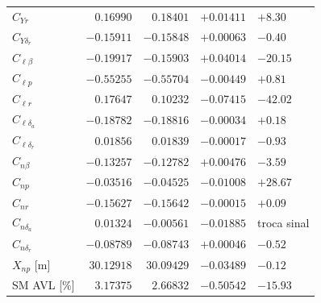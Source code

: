 \begin{tabular}{lrrrl}
$C_{Yr}$ & $0.16990$ & $0.18401$ & $+0.01411$ & $+8.30$ \\
$C_{Y\delta_r}$ & $-0.15911$ & $-0.15848$ & $+0.00063$ & $-0.40$ \\
$C_{\ell\beta}$ & $-0.19917$ & $-0.15903$ & $+0.04014$ & $-20.15$ \\
$C_{\ell p}$ & $-0.55255$ & $-0.55704$ & $-0.00449$ & $+0.81$ \\
$C_{\ell r}$ & $0.17647$ & $0.10232$ & $-0.07415$ & $-42.02$ \\
$C_{\ell\delta_a}$ & $-0.18782$ & $-0.18816$ & $-0.00034$ & $+0.18$ \\
$C_{\ell\delta_r}$ & $0.01856$ & $0.01839$ & $-0.00017$ & $-0.93$ \\
$C_{n\beta}$ & $-0.13257$ & $-0.12782$ & $+0.00476$ & $-3.59$ \\
$C_{np}$ & $-0.03516$ & $-0.04525$ & $-0.01008$ & $+28.67$ \\
$C_{nr}$ & $-0.15627$ & $-0.15642$ & $-0.00015$ & $+0.09$ \\
$C_{n\delta_a}$ & $0.01324$ & $-0.00561$ & $-0.01885$ & troca sinal \\
$C_{n\delta_r}$ & $-0.08789$ & $-0.08743$ & $+0.00046$ & $-0.52$ \\
$X_{np}$ [m] & $30.12918$ & $30.09429$ & $-0.03489$ & $-0.12$ \\
SM AVL [\%] & $3.17375$ & $2.66832$ & $-0.50542$ & $-15.93$ \\
\bottomrule
\end{tabular}

